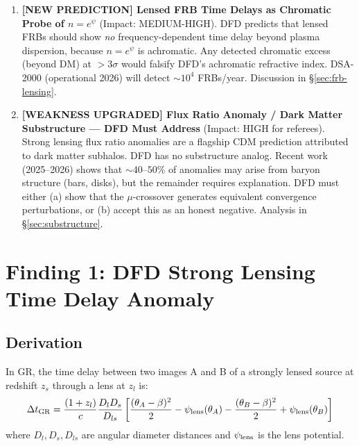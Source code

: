 \documentclass[11pt,a4paper]{article}
\begin{document}
\begin{tcolorbox}[colback=yellow!5!white, colframe=red!70!black,
  title=\textbf{TOP 5 FINDINGS --- WAVE 4, ITERATION 13}]
\begin{enumerate}
\item \textbf{[NEW PREDICTION] Lensed FRB Time Delays as
  Chromatic Probe of $n = e^\psi$} (Impact: MEDIUM-HIGH).
  DFD predicts that lensed FRBs should show \emph{no}
  frequency-dependent time delay beyond plasma dispersion,
  because $n = e^\psi$ is achromatic.  Any detected chromatic
  excess (beyond DM) at $> 3\sigma$ would falsify DFD's
  achromatic refractive index.  DSA-2000 (operational 2026)
  will detect $\sim 10^4$ FRBs/year.  Discussion in
  \S\ref{sec:frb-lensing}.

\item \textbf{[WEAKNESS UPGRADED] Flux Ratio Anomaly / Dark Matter
  Substructure --- DFD Must Address} (Impact: HIGH for referees).
  Strong lensing flux ratio anomalies are a flagship CDM
  prediction attributed to dark matter subhalos.  DFD has no
  substructure analog.  Recent work (2025--2026) shows that
  $\sim 40$--$50\%$ of anomalies may arise from baryon
  structure (bars, disks), but the remainder requires explanation.
  DFD must either (a) show that the $\mu$-crossover generates
  equivalent convergence perturbations, or (b) accept this as
  an honest negative.  Analysis in \S\ref{sec:substructure}.
\end{enumerate}

\end{tcolorbox}


\section{Finding 1: DFD Strong Lensing Time Delay Anomaly}
\label{sec:time-delay}

\subsection{Derivation}

In GR, the time delay between two images A and B of a strongly
lensed source at redshift $z_s$ through a lens at $z_l$ is:
\begin{equation}
\Delta t_{\rm GR} = \frac{(1+z_l)}{c}
\frac{D_l D_s}{D_{ls}} \left[\frac{(\theta_A - \beta)^2}{2}
- \psi_{\rm lens}(\theta_A)
- \frac{(\theta_B - \beta)^2}{2}
+ \psi_{\rm lens}(\theta_B)\right]
\label{eq:fermat-delay}
\end{equation}
where $D_l, D_s, D_{ls}$ are angular diameter distances and
$\psi_{\rm lens}$ is the lens potential.
\end{document}
